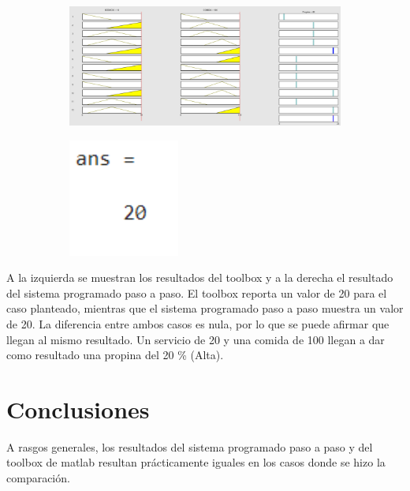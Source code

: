 \documentclass[11pt, letterpaper]{article}
\begin{document}
\begin{figure}[h]
	\centering
	\begin{subfigure}{0.40\textwidth} %
		\centering
		\includegraphics[width=1.4\textwidth]{IMG/RP13.png}
		\label{fig:G7}
	\end{subfigure}
	\hfill
	\begin{subfigure}{0.42\textwidth} %
		\centering
		\includegraphics[width=0.4\textwidth]{IMG/M13.png}
		\label{fig:G8}
	\end{subfigure}
	\label{fig:comparacion4}
\end{figure}

A la izquierda se muestran los resultados del toolbox y a la derecha el resultado del sistema programado paso a paso. El toolbox reporta un valor de 20 para el caso planteado, mientras que el sistema programado paso a paso muestra un valor de 20. La diferencia entre ambos casos es nula, por lo que se puede afirmar que llegan al mismo resultado. Un servicio de 20 y una comida de 100 llegan a dar como resultado una propina del 20 \% (Alta).


\section{Conclusiones}

A rasgos generales, los resultados del sistema programado paso a paso y del toolbox de matlab resultan prácticamente iguales en los casos donde se hizo la comparación.
\end{document}
